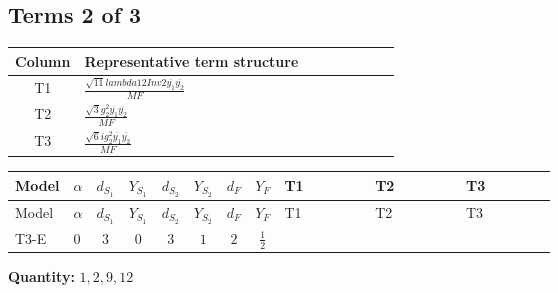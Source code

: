 \documentclass[8pt]{article}
\begin{document}
\begin{landscape}
\subsection*{Terms 2 of 3}
\begin{center}
\begin{tabular}{@{}c >{\raggedright\arraybackslash}p{0.82\linewidth}@{}}
\toprule
Column & Representative term structure \\
\midrule
T1 & \(\displaystyle \frac{\sqrt{11} lambda12Inv2 \overline{y_{1}} \overline{y_{2}}}{MF}\) \\
\midrule
T2 & \(\displaystyle \frac{\sqrt{3} g_{2}^{2} \overline{y_{1}} \overline{y_{2}}}{MF}\) \\
\midrule
T3 & \(\displaystyle \frac{\sqrt{6} i g_{2}^{2} \overline{y_{1}} \overline{y_{2}}}{MF}\) \\
\midrule
\bottomrule
\end{tabular}
\end{center}
\smallskip
\tiny
\begin{longtable}{@{}llcccccc >{\raggedright\arraybackslash}p{0.21\linewidth} >{\raggedright\arraybackslash}p{0.21\linewidth} >{\raggedright\arraybackslash}p{0.21\linewidth}@{}}
\toprule
Model & $\alpha$ & $d_{S_1}$ & $Y_{S_1}$ & $d_{S_2}$ & $Y_{S_2}$ & $d_F$ & $Y_F$ & T1 & T2 & T3 \\
\midrule
\endfirsthead
\toprule
Model & $\alpha$ & $d_{S_1}$ & $Y_{S_1}$ & $d_{S_2}$ & $Y_{S_2}$ & $d_F$ & $Y_F$ & T1 & T2 & T3 \\
\midrule
\endhead
T3-E & $0$ & $3$ & $0$ & $3$ & $1$ & $2$ & $\frac{1}{2}$ & \scriptsize\adjustbox{max width=\linewidth}{$\begin{gathered} \frac{3 \sqrt{11} lambda12Inv2 \overline{y_{1}} \overline{y_{2}}}{22 MF}\end{gathered}$} & \scriptsize\adjustbox{max width=\linewidth}{$\begin{gathered} \frac{15 \sqrt{3} g_{2}^{2} \overline{y_{1}} \overline{y_{2}}}{8 MF}\end{gathered}$} & \scriptsize\adjustbox{max width=\linewidth}{$\begin{gathered} - \frac{\sqrt{6} i g_{2}^{2} \overline{y_{1}} \overline{y_{2}}}{6 MF}\end{gathered}$} \\
\midrule
\bottomrule
\end{longtable}
\clearpage
\noindent\textbf{Quantity: }$\mathrm{1,2,9,12}$\par\smallskip

\end{landscape}
\end{document}
